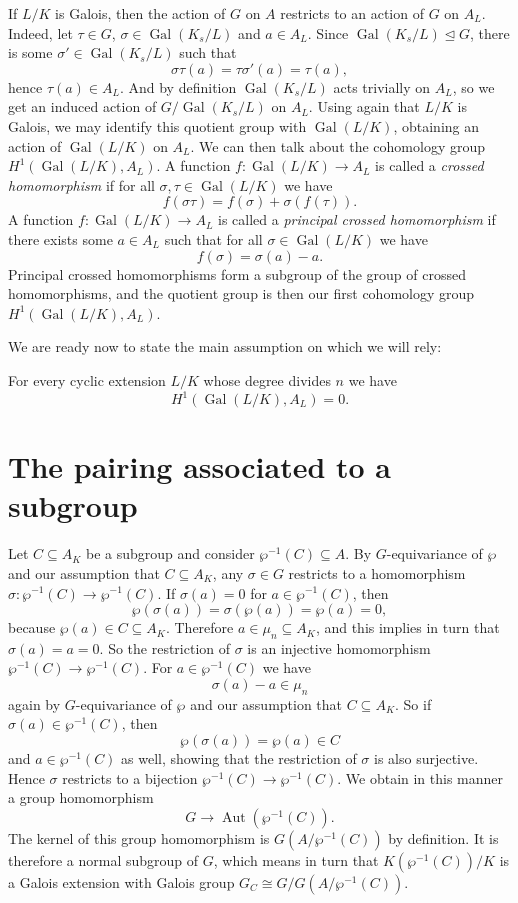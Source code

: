 \documentclass[12pt]{amsart}
\DeclareMathOperator{\Gal}{Gal}
\DeclareMathOperator{\Aut}{Aut}
\begin{document}
If $L/K$ is Galois, then the action of $G$ on $A$ restricts to an action of $G$ on $A_{L}$.
Indeed, let $\tau\in G$, $\sigma\in \Gal(K_{s}/L)$ and $a\in A_{L}$.
Since $\Gal(K_{s}/L)\trianglelefteq G$, there is some $\sigma'\in \Gal(K_{s}/L)$ such that
\[ \sigma\tau(a)=\tau\sigma'(a)=\tau(a), \]
hence $\tau(a)\in A_{L}$.
And by definition $\Gal(K_{s}/L)$ acts trivially on $A_{L}$, so we get an induced action of $G/\Gal(K_{s}/L)$ on $A_{L}$.
Using again that $L/K$ is Galois, we may identify this quotient group with $\Gal(L/K)$, obtaining an action of $\Gal(L/K)$ on $A_{L}$.
We can then talk about the cohomology group $H^{1}(\Gal(L/K),A_{L})$.
A function $f\colon \Gal(L/K)\to A_{L}$ is called a \textit{crossed homomorphism} if for all $\sigma,\tau\in \Gal(L/K)$ we have
\[ f(\sigma\tau)=f(\sigma)+\sigma (f(\tau)). \]
A function $f\colon \Gal(L/K)\to A_{L}$ is called a \textit{principal crossed homomorphism} if there exists some $a\in A_{L}$ such that for all $\sigma \in \Gal(L/K)$ we have
\[ f(\sigma)=\sigma(a)-a. \]
Principal crossed homomorphisms form a subgroup of the group of crossed homomorphisms, and the quotient group is then our first cohomology group $H^{1}(\Gal(L/K),A_{L})$.

We are ready now to state the main assumption on which we will rely:

\begin{axiom}
    For every cyclic extension $L/K$ whose degree divides $n$ we have
    \[ H^{1}(\Gal(L/K),A_{L})=0. \]
\end{axiom}

\section{The pairing associated to a subgroup}

Let $C\subseteq A_{K}$ be a subgroup and consider $\wp^{-1}(C)\subseteq A$.
By $G$-equivariance of $\wp$ and our assumption that $C\subseteq A_{K}$, any $\sigma\in G$ restricts to a homomorphism $\sigma\colon \wp^{-1}(C)\to \wp^{-1}(C)$.
If $\sigma(a)=0$ for $a\in \wp^{-1}(C)$, then
\[ \wp(\sigma(a))=\sigma(\wp(a))=\wp(a)=0, \]
because $\wp(a)\in C\subseteq A_{K}$.
Therefore $a\in \mu_{n}\subseteq A_{K}$, and this implies in turn that $\sigma(a)=a=0$.
So the restriction of $\sigma$ is an injective homomorphism $\wp^{-1}(C)\to \wp^{-1}(C)$.
For $a\in \wp^{-1}(C)$ we have
\[ \sigma(a)-a\in \mu_{n} \]
again by $G$-equivariance of $\wp$ and our assumption that $C\subseteq A_{K}$.
So if $\sigma(a)\in \wp^{-1}(C)$, then
\[ \wp(\sigma(a))=\wp(a)\in C \]
and $a\in \wp^{-1}(C)$ as well, showing that the restriction of $\sigma$ is also surjective.
Hence $\sigma$ restricts to a bijection $\wp^{-1}(C)\to \wp^{-1}(C)$.
We obtain in this manner a group homomorphism
\[ G\to \Aut(\wp^{-1}(C)). \]
The kernel of this group homomorphism is $G(A/\wp^{-1}(C))$ by definition.
It is therefore a normal subgroup of $G$, which means in turn that $K(\wp^{-1}(C))/K$ is a Galois extension with Galois group $G_{C}\cong G/G(A/\wp^{-1}(C))$.
\end{document}
